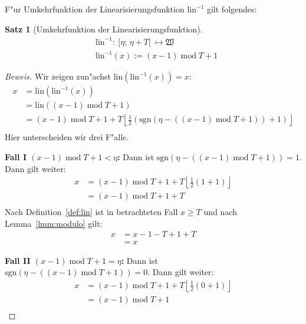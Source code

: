 \documentclass[a4paper]{article}
\newcommand*{\linf}{\mathrm{lin}}
\newcommand*{\sgn}{\mathrm{sgn}}
\newcommand*{\wkdays}{\mathfrak{W}}
\renewcommand{\mod}{\;\mathrm{mod}\;}
\numberwithin{equation}{section}
\newtheorem{thm}{Satz}
\begin{document}
\noindent F"ur Umkehrfunktion der Linearisierungsfunktion $\linf^{-1}$ gilt
folgendes:
\begin{thm}[Umkehrfunktion der Linearisierungsfunktion]
  \begin{equation}
  \begin{split}
    & \linf^{-1} :\ [\eta;\,\eta + T[\ \mapsto \wkdays \\
    & \linf^{-1}(x) := (x - 1) \mod T + 1
  \end{split}
  \end{equation}
\end{thm}
\begin{proof}[Beweis]
  Wir zeigen zun"achst $\linf(\linf^{-1}(x)) = x$:
  \begin{equation}
  \begin{split}
    x & = \linf(\linf^{-1}(x)) \\
    & = \linf((x - 1) \mod T + 1) \\
    & = (x - 1) \mod T + 1 + T\left\lfloor\frac{1}{2}
      (\sgn(\eta - ((x - 1) \mod T + 1)) + 1)\right\rfloor \\
  \end{split}
  \end{equation}
  Hier unterscheiden wir drei F"alle.

  \noindent\textbf{Fall I $(x - 1) \mod T + 1 < \eta$:} Dann ist
  $\sgn(\eta - ((x - 1) \mod T + 1)) = 1$. Dann gilt weiter:
  \begin{equation}
  \begin{split}
    x & = (x - 1) \mod T + 1 + T\left\lfloor\frac{1}{2} (1 + 1)\right\rfloor \\
    & = (x - 1) \mod T + 1 + T \\
  \end{split}
  \end{equation}
  Nach Definition~\ref{def:lin} ist in betrachteten Fall $x \ge T$ und nach
  Lemma~\ref{lmm:modulo} gilt:
  \begin{equation}
  \begin{split}
    x & = x - 1 - T + 1 + T \\
    & = x
  \end{split}
  \end{equation}

  \noindent\textbf{Fall II $(x - 1) \mod T + 1 = \eta$:} Dann ist
  $\sgn(\eta - ((x - 1) \mod T + 1)) = 0$. Dann gilt weiter:
  \begin{equation}
  \begin{split}
    x & = (x - 1) \mod T + 1 + T\left\lfloor\frac{1}{2} (0 + 1)\right\rfloor \\
    & = (x - 1) \mod T + 1 \\
  \end{split}
  \end{equation}


\end{proof}
\end{document}
